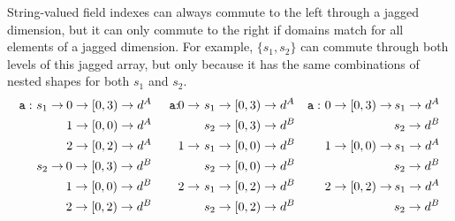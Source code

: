 \documentclass[12pt]{article}
\begin{document}
String-valued field indexes can always commute to the left through a jagged dimension, but it can only commute to the right if domains match for all elements of a jagged dimension. For example, $\{s_1, s_2\}$ can commute through both levels of this jagged array, but only because it has the same combinations of nested shapes for both $s_1$ and $s_2$.
\begin{align*}
\texttt{a}: &\ s_1 \to\mbox{\hspace{-0.5 cm}} & 0 \to [0, 3) \to d^A & \mbox{\hspace{0.5 cm}\texttt{a}:\hspace{-0.5 cm}} &\ 0 \to &\ s_1 \to [0, 3) \to d^A & \texttt{a}: &\ 0 \to [0, 3) \to\mbox{\hspace{-0.5 cm}} &\ s_1 \to d^A \\
& &\ 1 \to [0, 0) \to d^A                                  & & &\ s_2 \to [0, 3) \to d^B                                & & & s_2 \to d^B \\
& &\ 2 \to [0, 2) \to d^A                                  & &\ 1 \to &\ s_1 \to [0, 0) \to d^B                         & &\ 1 \to [0, 0) \to\mbox{\hspace{-0.5 cm}} &\ s_1 \to d^A \\
&\ s_2 \to\mbox{\hspace{-0.5 cm}} & 0 \to [0, 3) \to d^B                         & & &\ s_2 \to [0, 0) \to d^B                                & & & s_2 \to d^B \\
& &\ 1 \to [0, 0) \to d^B                                  & &\ 2 \to &\ s_1 \to [0, 2) \to d^B                         & &\ 2 \to [0, 2) \to\mbox{\hspace{-0.5 cm}} &\ s_1 \to d^A \\
& &\ 2 \to [0, 2) \to d^B                                  & & &\ s_2 \to [0, 2) \to d^B                                & & & s_2 \to d^B
\end{align*}
\end{document}
